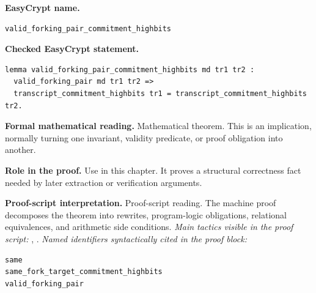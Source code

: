 \begin{formaltheorem}
\noindent\textbf{EasyCrypt name.}
\begin{lstlisting}[language=EasyCrypt,basicstyle=\ttfamily\scriptsize]
valid_forking_pair_commitment_highbits
\end{lstlisting}
\noindent\textbf{Checked EasyCrypt statement.}
\begin{lstlisting}[language=EasyCrypt,basicstyle=\ttfamily\scriptsize]
lemma valid_forking_pair_commitment_highbits md tr1 tr2 :
  valid_forking_pair md tr1 tr2 =>
  transcript_commitment_highbits tr1 = transcript_commitment_highbits tr2.
\end{lstlisting}
\noindent\textbf{Formal mathematical reading.}
Mathematical theorem. This is an implication, normally turning one invariant, validity predicate, or proof obligation into another.

\noindent\textbf{Role in the proof.}
Use in this chapter. It proves a structural correctness fact needed by later extraction or verification arguments.

\noindent\textbf{Proof-script interpretation.}
Proof-script reading. The machine proof decomposes the theorem into rewrites, program-logic obligations, relational equivalences, and arithmetic side conditions.
\emph{Main tactics visible in the proof script:} , .
\emph{Named identifiers syntactically cited in the proof block:}
\begin{lstlisting}[language=EasyCrypt,basicstyle=\ttfamily\scriptsize]
same
same_fork_target_commitment_highbits
valid_forking_pair
\end{lstlisting}

\end{formaltheorem}

